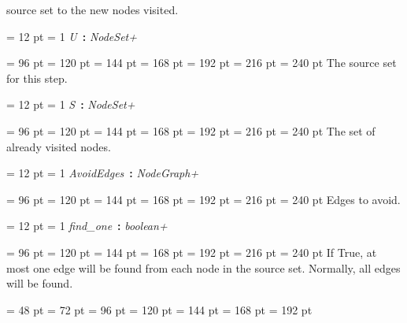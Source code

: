 {{{{{{{{                source set to the new nodes visited.
\par}
{\par \pagebreak[3.000000] \noindent \hangindent = 12 pt \hangafter = 1 
{\em U\/}~{\bf :}  {\em NodeSet+\/}\par}
{\par \noindent  \leftskip = 96 pt  \leftmargini = 120 pt  \leftmarginii = 144 pt  \leftmarginiii = 168 pt  \leftmarginiv = 192 pt  \leftmarginv = 216 pt  \leftmarginvi = 240 pt  The source set for this step.
\par}
{\par \pagebreak[3.000000] \noindent \hangindent = 12 pt \hangafter = 1 
{\em S\/}~{\bf :}  {\em NodeSet+\/}\par}
{\par \noindent  \leftskip = 96 pt  \leftmargini = 120 pt  \leftmarginii = 144 pt  \leftmarginiii = 168 pt  \leftmarginiv = 192 pt  \leftmarginv = 216 pt  \leftmarginvi = 240 pt  The set of already visited nodes.
\par}
{\par \pagebreak[3.000000] \noindent \hangindent = 12 pt \hangafter = 1 
{\em AvoidEdges\/}~{\bf :}  {\em NodeGraph+\/}\par}
{\par \noindent  \leftskip = 96 pt  \leftmargini = 120 pt  \leftmarginii = 144 pt  \leftmarginiii = 168 pt  \leftmarginiv = 192 pt  \leftmarginv = 216 pt  \leftmarginvi = 240 pt  Edges to avoid.
\par}
{\par \pagebreak[3.000000] \noindent \hangindent = 12 pt \hangafter = 1 
{\em find{\_}one\/}~{\bf :}  {\em boolean+\/}\par}
{\par \noindent  \leftskip = 96 pt  \leftmargini = 120 pt  \leftmarginii = 144 pt  \leftmarginiii = 168 pt  \leftmarginiv = 192 pt  \leftmarginv = 216 pt  \leftmarginvi = 240 pt  If True, at most one edge will be found from each node
         in the source set. Normally, all edges will be found.
\par}
\par}
\par}
\par}
\par}
{\par \noindent  \leftskip = 48 pt  \leftmargini = 72 pt  \leftmarginii = 96 pt  \leftmarginiii = 120 pt  \leftmarginiv = 144 pt  \leftmarginv = 168 pt  \leftmarginvi = 192 pt {\par \noindent
}}}}}

